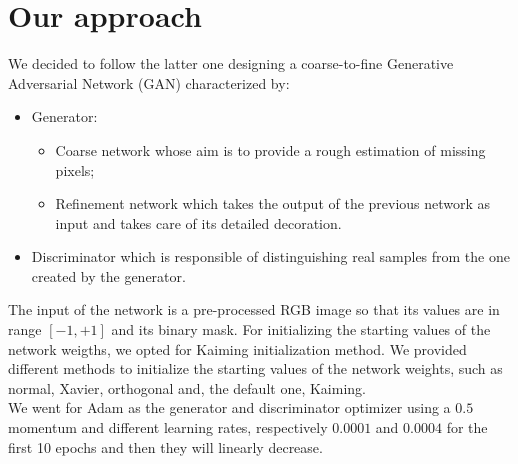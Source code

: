 \documentclass[10pt,twocolumn,letterpaper]{article}
\begin{document}
\section{Our approach}
We decided to follow the latter one designing a coarse-to-fine Generative Adversarial Network (GAN) characterized by:
\begin{itemize}
	\item
	Generator:
	\begin{itemize}
		\item 
		Coarse network whose aim is to provide a rough estimation of missing pixels;
		\item
		Refinement network which takes the output of the previous network as input and takes care of its detailed decoration.
	\end{itemize}
	\item
	Discriminator which is responsible of distinguishing real samples from the one created by the generator.
\end{itemize}
The input of the network is a pre-processed RGB image so that its values are in range \([-1,+1]\) and its binary mask.
For initializing the starting values of the network weigths, we opted for Kaiming initialization method.
We provided different methods to initialize the starting values of the network weights, such as normal, Xavier, orthogonal and, the default one, Kaiming.
\\
We went for Adam as the generator and discriminator optimizer using a \(0.5\) momentum and different learning rates, respectively \(0.0001\) and \(0.0004\) for the first 10 epochs and then they will linearly decrease.
\end{document}
